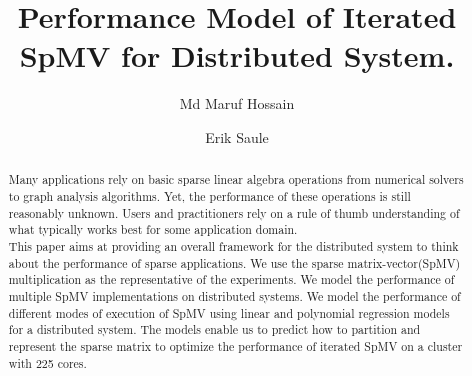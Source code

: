 \documentclass[sigconf,review,anonymous]{acmart}
\begin{document}
%
\newcommand{\todo}[1]{\color{red}\textbf{\hl{#1}}\color{black}\xspace}
\newcommand{\rom}[1]{\expandafter{\romannumeral #1\relax}}
%
\title{Performance Model of Iterated SpMV for Distributed System.}

\author{Md Maruf Hossain}

\author{Erik Saule}

\begin{abstract}
Many applications rely on basic sparse linear algebra operations from numerical solvers to graph analysis 
algorithms. Yet, the performance of these operations is still reasonably unknown. Users and practitioners 
rely on a rule of thumb understanding of what typically works best for some application domain.
\\ 
This paper aims at providing an overall framework for the distributed system to think about the performance 
of sparse applications. We use the sparse matrix-vector(SpMV) multiplication as the representative of the 
experiments. We model the performance of multiple SpMV implementations on distributed systems. 
 We model the performance of different modes of execution of SpMV using linear and polynomial regression models for a distributed system. 
 The models enable us to predict how to partition and represent the sparse matrix to optimize the performance of iterated SpMV on a cluster with 225 cores.
\end{abstract}
%


%
\maketitle
\end{document}
